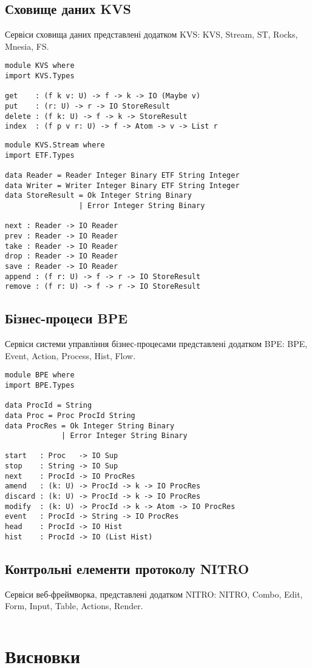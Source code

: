 \newpage
\subsection{Сховище даних KVS}
Сервіси сховища даних представлені додатком KVS: KVS,
Stream, ST, Rocks, Mnesia, FS.

\begin{lstlisting}
module KVS where
import KVS.Types

get    : (f k v: U) -> f -> k -> IO (Maybe v)
put    : (r: U) -> r -> IO StoreResult
delete : (f k: U) -> f -> k -> StoreResult
index  : (f p v r: U) -> f -> Atom -> v -> List r
\end{lstlisting}

\begin{lstlisting}
module KVS.Stream where
import ETF.Types

data Reader = Reader Integer Binary ETF String Integer
data Writer = Writer Integer Binary ETF String Integer
data StoreResult = Ok Integer String Binary
                 | Error Integer String Binary

next : Reader -> IO Reader
prev : Reader -> IO Reader
take : Reader -> IO Reader
drop : Reader -> IO Reader
save : Reader -> IO Reader
append : (f r: U) -> f -> r -> IO StoreResult
remove : (f r: U) -> f -> r -> IO StoreResult
\end{lstlisting}

\subsection{Бізнес-процеси BPE}
Сервіси системи управління бізнес-процесами
представлені додатком BPE: BPE, Event, Action, Process, Hist, Flow.

\begin{lstlisting}
module BPE where
import BPE.Types

data ProcId = String
data Proc = Proc ProcId String
data ProcRes = Ok Integer String Binary
             | Error Integer String Binary

start   : Proc   -> IO Sup
stop    : String -> IO Sup
next    : ProcId -> IO ProcRes
amend   : (k: U) -> ProcId -> k -> IO ProcRes
discard : (k: U) -> ProcId -> k -> IO ProcRes
modify  : (k: U) -> ProcId -> k -> Atom -> IO ProcRes
event   : ProcId -> String -> IO ProcRes
head    : ProcId -> IO Hist
hist    : ProcId -> IO (List Hist)
\end{lstlisting}

\subsection{Контрольні елементи протоколу NITRO}
Сервіси веб-фреймворка, представлені додатком NITRO: NITRO, Combo,
Edit, Form, Input, Table, Actions, Render.

\begin{lstlisting}
\end{lstlisting}

\section{Висновки}